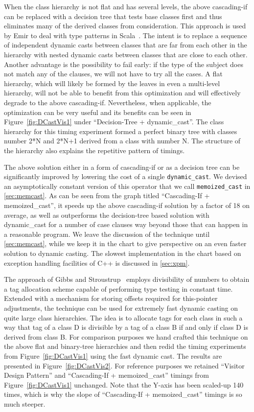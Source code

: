 \documentclass[preprint]{sigplanconf}
\makeatletter
\DeclareRobustCommand{\code}[1]{{\lstinline[breaklines=false,escapechar=@]{#1}}}
\makeatother
\begin{document}
When the class hierarchy is not flat and has several levels, the above cascading-if can be replaced 
with a decision tree that tests base classes first and thus eliminates many of 
the derived classes from consideration. This approach is used by Emir to deal with 
type patterns in Scala~\cite[]{EmirThesis}. The intent is to 
replace a sequence of independent dynamic casts between classes that are far 
from each other in the hierarchy with nested dynamic casts between classes that 
are close to each other. Another advantage is the possibility to fail early: 
if the type of the subject does not match any of the clauses, we will not have to try all the cases. 
A flat hierarchy, which will likely be formed by the leaves in even a multi-level 
hierarchy, will not be able to benefit from this optimization and 
will effectively degrade to the above cascading-if. Nevertheless, when 
applicable, the optimization can be very useful and its benefits can be seen in
Figure~\ref{fig:DCastVis1} under ``Decision-Tree + dynamic\_cast''. The class 
hierarchy for this timing experiment formed a perfect binary tree with 
classes number 2*N and 2*N+1 derived from a class with number N. The structure 
of the hierarchy also explains the repetitive pattern of timings.

The above solution either in a form of cascading-if or as a decision tree can be 
significantly improved by lowering the cost of a single \code{dynamic_cast}. 
We devised an asymptotically constant version of this operator that we call
\code{memoized_cast} in \textsection\ref{sec:memcast}. As can be seen 
from the graph titled ``Cascading-If + memoized\_cast'', it speeds up the 
above cascading-if solution by a factor of 18 on average, as well as outperforms 
the decision-tree based solution with dynamic\_cast for a number of case clauses 
way beyond those that can happen in a reasonable program. 
We leave the discussion of the technique until 
\textsection\ref{sec:memcast}, while we keep it in the chart to give perspective on 
an even faster solution to dynamic casting. The slowest implementation in the 
chart based on exception handling facilities of C++ is discussed in 
\textsection\ref{sec:xpm}.

The approach of Gibbs and Stroustrup~\cite{FastDynCast} employs divisibility of numbers to obtain a 
tag allocation scheme capable of performing type testing in constant time. 
Extended with a mechanism for storing offsets required for this-pointer 
adjustments, the technique can be used for extremely fast dynamic casting on 
quite large class hierarchies. The idea is to allocate tags 
for each class in such a way that tag of a class D is divisible by a tag of a 
class B if and only if class D is derived from class B. For comparison purposes 
we hand crafted this technique on the above flat and binary-tree hierarchies and 
then redid the timing experiments from Figure~\ref{fig:DCastVis1} using the fast 
dynamic cast. The results are presented in Figure~\ref{fig:DCastVis2}. For 
reference purposes we retained ``Visitor Design Pattern'' and ``Cascading-If + 
memoized\_cast'' timings from Figure~\ref{fig:DCastVis1} unchanged. Note that 
the Y-axis has been scaled-up 140 times, which is why the slope of 
``Cascading-If + memoized\_cast'' timings is so much steeper.
\end{document}
